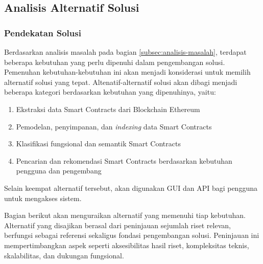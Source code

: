 \subsection{Analisis Alternatif Solusi}
\label{subsec:analisis-alternatif-solusi}

\subsubsection{Pendekatan Solusi}
Berdasarkan analisis masalah pada bagian \ref{subsec:analisis-masalah}, terdapat beberapa kebutuhan yang perlu dipenuhi dalam pengembangan solusi. Pemenuhan kebutuhan-kebutuhan ini akan menjadi konsiderasi untuk memilih alternatif solusi yang tepat. Altenatif-alternatif solusi akan dibagi menjadi beberapa kategori berdasarkan kebutuhan yang dipenuhinya, yaitu:

\begin{enumerate}
	\item Ekstraksi data Smart Contracts dari Blockchain Ethereum
	\item Pemodelan, penyimpanan, dan \textit{indexing} data Smart Contracts
	\item Klasifikasi fungsional dan semantik Smart Contracts
	\item Pencarian dan rekomendasi Smart Contracts berdasarkan kebutuhan pengguna dan pengembang
\end{enumerate}

Selain keempat alternatif tersebut, akan digunakan GUI dan API bagi pengguna untuk mengakses sistem.

Bagian berikut akan menguraikan alternatif yang memenuhi tiap kebutuhan. Alternatif yang disajikan berasal dari peninjauan sejumlah riset relevan, berfungsi sebagai referensi sekaligus fondasi pengembangan solusi. Peninjauan ini mempertimbangkan aspek seperti aksesibilitas hasil riset, kompleksitas teknis, skalabilitas, dan dukungan fungsional.













